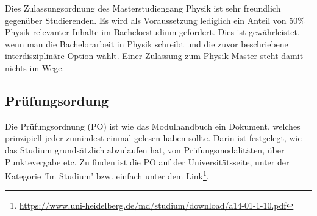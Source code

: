 Dies Zulassungsordnung des Masterstudiengang Physik ist sehr freundlich gegenüber Studierenden. Es wird als Voraussetzung lediglich ein Anteil von 50\% Physik-relevanter Inhalte im Bachelorstudium gefordert. Dies ist gewährleistet, wenn man die Bachelorarbeit in Physik schreibt und die zuvor beschriebene interdisziplinäre Option wählt. Einer Zulassung zum Physik-Master steht damit nichts im Wege.

\subsection{Prüfungsordung}

Die Prüfungsordnung (PO) ist wie das Modulhandbuch ein Dokument, welches prinzipiell jeder zumindest einmal gelesen haben sollte. Darin ist festgelegt, wie das Studium grundsätzlich abzulaufen hat, von Prüfungsmodalitäten, über Punktevergabe etc. Zu finden ist die PO auf der Universitätsseite, unter der Kategorie 'Im Studium' bzw. einfach unter dem Link\footnote{\url{https://www.uni-heidelberg.de/md/studium/download/a14-01-1-10.pdf}}.

\vfill
\begin{figure}[h] %
\end{figure}
